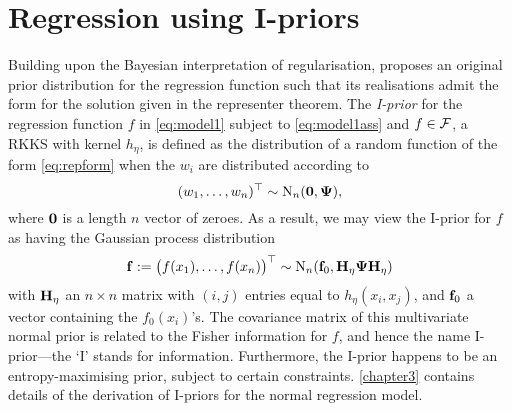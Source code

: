 \documentclass[11pt,twoside,openright,showframe]{report}
\begin{document}
\section{Regression using I-priors}
\label{sec:introregiprior}

Building upon the Bayesian interpretation of regularisation, \citet{bergsma2017} proposes an original prior distribution for the regression function such that its realisations admit the form for the solution given in the representer theorem.
The \emph{I-prior} for the regression function $f$ in \cref{eq:model1} subject to \cref{eq:model1ass} and $f\in{\mathcal F}$, a RKKS with kernel $h_\eta$, is defined as the distribution of a random function of the form \cref{eq:repform} when the $w_i$ are distributed according to 
%
\[
  (w_1,\dots,w_n)^\top \sim \operatorname{N}_n({\mathbf 0},{\bm\Psi}),
\]
%
where ${\mathbf 0}$ is a length $n$ vector of zeroes.
As a result, we may view the I-prior for $f$ as having the Gaussian process distribution
%
\begin{align}\label{eq:iprior}
  {\mathbf f} := \big(f(x_1),\dots,f(x_n) \big)^\top \sim \operatorname{N}_n({\mathbf f}_0, {\mathbf H}_\eta{\bm\Psi}{\mathbf H}_\eta)
\end{align}
%
with ${\mathbf H}_{\eta}$ an $n \times n$ matrix with $(i,j)$ entries equal to $h_\eta(x_i,x_j)$, and ${\mathbf f}_0$ a vector containing the $f_0(x_i)$'s.
The covariance matrix of this multivariate normal prior is related to the Fisher information for $f$, and hence the name I-prior---the `I' stands for information.
Furthermore, the I-prior happens to be an entropy-maximising prior, subject to certain constraints.
\cref{chapter3} contains details of the derivation of I-priors for the normal regression model.
\end{document}
